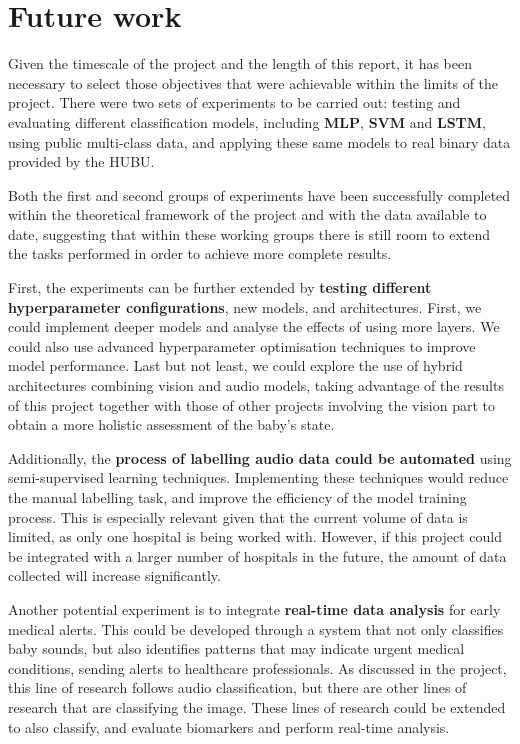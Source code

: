 \section{Future work}

Given the timescale of the project and the length of this report, it has been necessary to select those objectives that were achievable within the limits of the project. There were two sets of experiments to be carried out: testing and evaluating different classification models, including \textbf{MLP}, \textbf{SVM} and \textbf{LSTM}, using public multi-class data, and applying these same models to real binary data provided by the HUBU.

Both the first and second groups of experiments have been successfully completed within the theoretical framework of the project and with the data available to date, suggesting that within these working groups there is still room to extend the tasks performed in order to achieve more complete results.

First, the experiments can be further extended by \textbf{testing different hyperparameter configurations}, new models, and architectures. First, we could implement deeper models and analyse the effects of using more layers. We could also use advanced hyperparameter optimisation techniques to improve model performance. Last but not least, we could explore the use of hybrid architectures combining vision and audio models, taking advantage of the results of this project together with those of other projects involving the vision part to obtain a more holistic assessment of the baby's state.

Additionally, the \textbf{process of labelling audio data could be automated} using semi-supervised learning techniques. Implementing these techniques would reduce the manual labelling task, and improve the efficiency of the model training process. This is especially relevant given that the current volume of data is limited, as only one hospital is being worked with. However, if this project could be integrated with a larger number of hospitals in the future, the amount of data collected will increase significantly.

Another potential experiment is to integrate \textbf{real-time data analysis} for early medical alerts. This could be developed through a system that not only classifies baby sounds, but also identifies patterns that may indicate urgent medical conditions, sending alerts to healthcare professionals. As discussed in the project, this line of research follows audio classification, but there are other lines of research that are classifying the image. These lines of research could be extended to also classify, and evaluate biomarkers and perform real-time analysis. 


